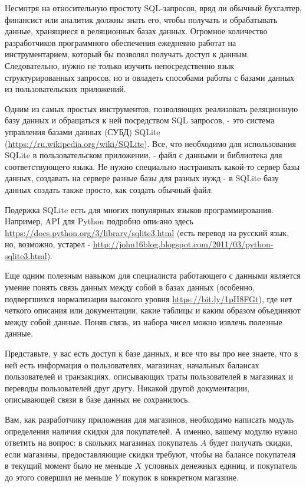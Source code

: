 
Несмотря на относительную простоту SQL-запросов, вряд ли обычный бухгалтер, финансист или аналитик должны знать его, чтобы получать и обрабатывать данные, хранящиеся в реляционных базах данных. Огромное количество разработчиков программного обеспечения ежедневно работат на инструментарием, который бы позволял получать доступ к данным. Следовательно, нужно не только изучить непосредственно язык структурированных запросов, но и овладеть способами работы с базами данных из пользовательских приложений.

Одним из самых простых инструментов, позволяющих реализовать реляционную базу данных и обращаться к ней посредством SQL запросов, - это система управления базами данных (СУБД) SQLite (\url{https://ru.wikipedia.org/wiki/SQLite}). Все, что необходимо для использования SQLite в пользовательском приложении, - файл с данными и библиотека для соответствующего языка. Не нужно специально настраивать какой-то сервер базы данных, создавать на сервере разные базы для разных нужд - в SQLite базу данных создать также просто, как создать обычный файл.

Подержка SQLite есть для многих популярных языков программирования. Например, API для Python подробно опиcано здесь \url{https://docs.python.org/3/library/sqlite3.html} (есть перевод на русский язык, но, возможно, устарел - \url{http://john16blog.blogspot.com/2011/03/python-sqlite3.html}). 

Еще одним полезным навыком для специалиста работающего с данными является умение понять связь данных между собой в базах данных (особенно, подвергшихся нормализации высокого уровня \url{https://bit.ly/1pH8FGt}), где нет четкого описания или документации, какие таблицы и каким образом объединяют между собой данные. Поняв связь, из набора чисел можно извлечь полезные данные. 

Представьте, у вас есть доступ к базе данных, и все что вы про нее знаете, что в ней есть информация о пользователях, магазинах, начальных балансах пользователей и транзакциях, описывающих траты пользователей в магазинах и переводы пользователей друг другу. Никакой другой документации, описывающей связи в базе данных не сохранилось.

Вам, как разработчику приложения для магазинов, необходимо написать модуль определения наличия скидки для покупателей. А именно, вашему модулю нужно ответить на вопрос: в скольких магазинах покупатель $A$ будет получать скидки, если магазины, предоставляющие скидки требуют, чтобы на балансе покупателя в текущий момент было не меньше $X$ условных денежных единиц, и покупатель до этого совершил не меньше $Y$ покупок в конкретном магазине.

